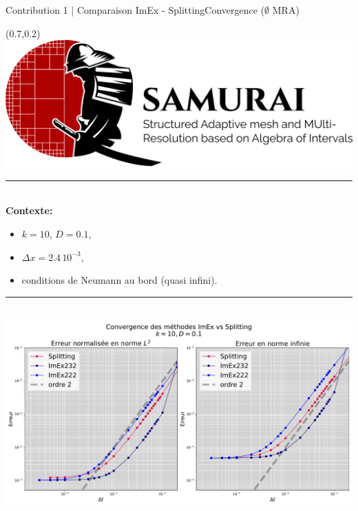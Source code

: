 \begin{frame}{Contribution 1 | Comparaison ImEx - Splitting}{Convergence ($\emptyset$ MRA)}
    \begin{textblock*}{40pt}(0.7\paperwidth,0.2\paperheight)
        \includegraphics[scale=.03]{medias/2_/1_/light_logo.png}
    \end{textblock*}

    \noindent\color{Primary}\rule{\linewidth}{0.6pt}\color{black}\\
    \textbf{Contexte:\\}
    \begin{itemize}
        \item $k=10$, $D=0.1$,
        \item $\Delta x = 2.4 \, 10^{-3}$,
        \item conditions de Neumann au bord (quasi infini).
    \end{itemize}
    \noindent\color{Primary}\rule{\linewidth}{0.6pt}\color{black}\\
    \centering\includegraphics[width =.65 \textwidth]{ medias/2_/1_/ImEx_vs_splitting_k10_D0.1.pdf}
\end{frame}

